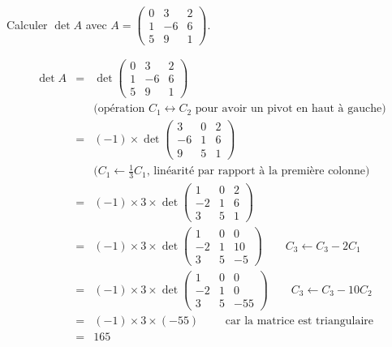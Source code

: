 \documentclass{book}
\begin{document}
\begin{Exemple}
Calculer $\det A$ avec $A  = \begin{pmatrix}
        0 & 3 & 2\\
        1 & -6 & 6\\
        5 & 9 & 1
       \end{pmatrix}$.
\begin{Demonstration}
$$\begin{array}{rcl}
\det A
  & = & \det \begin{pmatrix}
        0 & 3 & 2\\
        1 & -6 & 6\\
        5 & 9 & 1
       \end{pmatrix} \\
  && \text{(opération $C_1 \leftrightarrow C_2$ pour avoir un pivot en haut à gauche)} \\    
  & = &  (-1)\times \det \begin{pmatrix}
        3 & 0 & 2\\
        -6& 1 & 6\\
        9 & 5 & 1
       \end{pmatrix} \\
  && \text{($C_1 \leftarrow \frac{1}{3} C_1$, linéarité par rapport à la première colonne)}\\     
  & = &  (-1)\times 3 \times \det \begin{pmatrix}
        1 & 0 & 2\\
        -2& 1 & 6\\
        3 & 5 & 1
       \end{pmatrix}  \\
  & = &  (-1)\times 3 \times \det \begin{pmatrix}
        1 & 0 & 0\\
        -2& 1 & 10\\
        3 & 5 & -5
       \end{pmatrix}  \qquad \text{$C_3 \leftarrow C_3-2C_1$} \\
  & = &  (-1)\times 3 \times \det \begin{pmatrix}
        1 & 0 & 0\\
        -2& 1 & 0\\
        3 & 5 & -55
       \end{pmatrix}  \qquad \text{$C_3 \leftarrow C_3-10C_2$} \\
  & = &  (-1)\times 3 \times (-55)  \qquad \text{ car la matrice est triangulaire} \\
  & = & 165
\end{array}$$
\end{Demonstration}
\end{Exemple}
\end{document}

